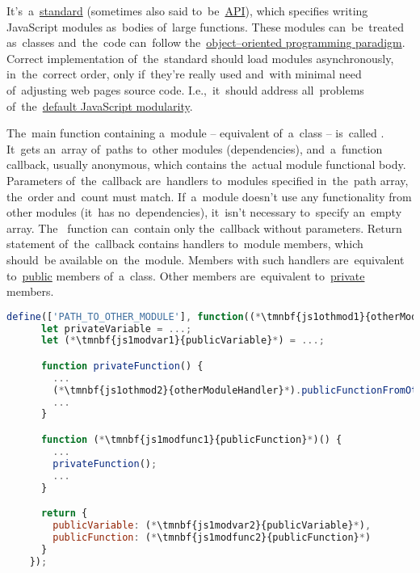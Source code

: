 \label{amd}
It's~a~\hyperref[protocolstandard]{standard} (sometimes also said to~be~\hyperref[api]{API}), which specifies writing JavaScript modules as~bodies of~large functions.
These modules can~be~treated as~classes and~the~code can~follow the~\hyperref[objectorientedprogramming]{object--oriented programming paradigm}.
Correct implementation of~the~standard should load modules asynchronously, in~the~correct order, only if~they're really used and~with minimal need of~adjusting web pages source code.
I.e.,~it~should address all~problems of~the~\hyperref[javascriptmodularity]{default JavaScript modularity}.

\emtwen
{}
\label{amdsyntax}
The~main function containing a~module -- equivalent of~a~class -- is~called .
It~gets an~array of~paths to~other modules (dependencies), and~a~function callback, usually anonymous, which contains the~actual module functional body.
Parameters of~the~callback are~handlers to~modules specified in~the~path array, the~order and~count must match.
If~a~module doesn't use any functionality from other modules (it~has no~dependencies), it~isn't necessary to~specify an~empty array.
The~ function can~contain only the~callback without parameters.
Return statement of~the~callback contains handlers to~module members, which should~be available on~the~module.
Members with such handlers are~equivalent to~\hyperref[javapublic]{public} members of~a~class.
Other members are~equivalent to~\hyperref[javaprivate]{private} members.
\newpage

\begin{lstlisting}[language=JavaScript]
    define(['PATH_TO_OTHER_MODULE'], function((*\tmnbf{js1othmod1}{otherModuleHandler}*)) {
      let privateVariable = ...;
      let (*\tmnbf{js1modvar1}{publicVariable}*) = ...;

      function privateFunction() {
        ...
        (*\tmnbf{js1othmod2}{otherModuleHandler}*).publicFunctionFromOtherModule();
        ...
      }

      function (*\tmnbf{js1modfunc1}{publicFunction}*)() {
        ...
        privateFunction();
        ...
      }

      return {
        publicVariable: (*\tmnbf{js1modvar2}{publicVariable}*),
        publicFunction: (*\tmnbf{js1modfunc2}{publicFunction}*)
      }
    });
\end{lstlisting}

